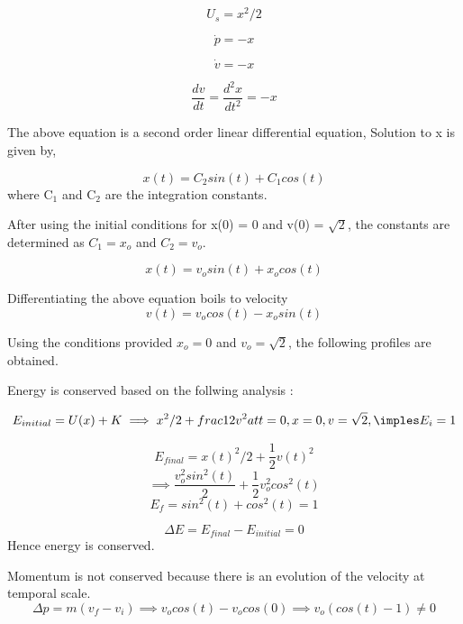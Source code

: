 \documentclass{article}
\begin{document}
$$U_{s} = x^2/2 $$

$$ \dot{p} = -x$$

$$ \dot{v} = -x$$

\begin{equation}
\frac{dv}{dt} = \frac{d^2x}{dt^2} = -x
\end{equation}

The above equation is a second order linear differential equation,
Solution to x is given by,

\begin{equation}
\boxed{x(t) = C_{2}sin(t) + C_{1}cos(t)}
\end{equation}
where C$_{\text{1}}$ and C$_{\text{2}}$ are the integration constants.

After using the initial conditions for x(0) = 0 and v(0) = $\sqrt 2$, the constants are determined as $C_{1} = x_{o}$ and $C_{2} = v_{o}$.

\begin{equation}
\boxed{x(t) = v_{o}sin(t) + x_{o}cos(t)}
\end{equation}

Differentiating the above equation boils to velocity
\begin{equation}
\boxed{v(t) = v_{o}cos(t) - x_{o}sin(t)}
\end{equation}

Using the conditions provided $x_{o} = 0$ and $v_{o} = \sqrt2$, the following profiles are obtained.

Energy is conserved based on the follwing analysis : 

\begin{equation}
E_{initial} = U(x) + K
\implies x^2/2 + frac{1}{2}v^2
at t=0, x=0, v=\sqrt 2,
\imples E_{i} = 1
\end{equation}

$$ E_{final} = x(t)^2/2 + \frac{1}{2}v(t)^2 $$
$$ \implies \frac{v_{o}^2sin^2(t)}{2} + \frac{1}{2}v_{o}^2cos^2(t) $$
$$ E_{f} = sin^2(t) + cos^2(t)  = 1 $$

$$ \Delta E = E_{final}-E_{initial} = 0 $$
Hence energy is conserved.

Momentum is not conserved because there is an evolution of the velocity at temporal scale.
\begin{equation}
\Delta p = m(v_{f} -v_{i})
\implies v_{o}cos(t)-v_{o}cos(0)
\implies v_{o}(cos(t)-1) \neq 0
\end{equation}
\end{document}
